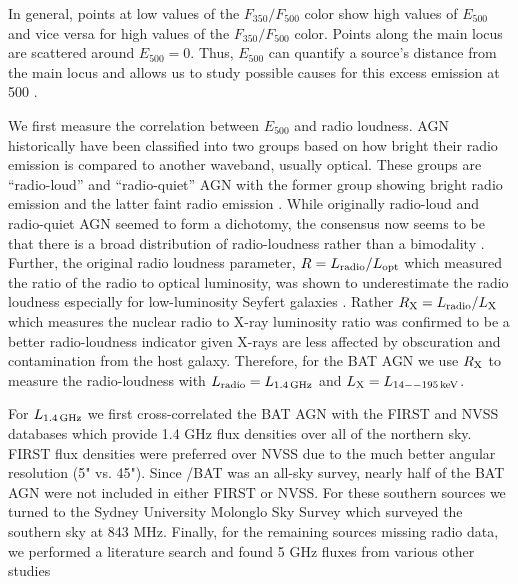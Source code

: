 In general, points at low values of the $F_{350}/F_{500}$ color show high values of $E_{500}$ and vice versa for high values of the $F_{350}/F_{500}$ color. Points along the main locus are scattered around $E_{500} = 0$. Thus, $E_{500}$ can quantify a source's distance from the main locus and allows us to study possible causes for this excess emission at 500 \um.

We first measure the correlation between $E_{500}$ and radio loudness. AGN historically have been classified into two groups based on how bright their radio emission is compared to another waveband, usually optical. These groups are ``radio-loud'' and ``radio-quiet'' AGN with the former group showing bright radio emission and the latter faint radio emission \citep{Kellermann:1989sf,Xu:1999ty}. While originally radio-loud and radio-quiet AGN seemed to form a dichotomy, the consensus now seems to be that there is a broad distribution of radio-loudness rather than a bimodality \citep{Laor:2003yg,White:2000rz,Cirasuolo:2003rm,Cirasuolo:2003zl,Laor:2003yg}. Further, the original radio loudness parameter, $R = L_{\rm radio}/L_{\rm opt}$ which measured the ratio of the radio to optical luminosity, was shown to underestimate the radio loudness especially for low-luminosity Seyfert galaxies \citep{Terashima:2003fv}. Rather $R_{\rm X} = L_{\rm radio}/L_{\rm X}$ which measures the nuclear radio to X-ray luminosity ratio was confirmed to be a better radio-loudness indicator given X-rays are less affected by obscuration and contamination from the host galaxy. Therefore, for the BAT AGN we use $R_{\rm X}$ to measure the radio-loudness with $L_{\rm radio} = L_{\rm 1.4\,GHz}$ and $L_{\rm X} = L_{\rm 14--195\,keV}$. 

For $L_{\rm 1.4\,GHz}$ we first cross-correlated the BAT AGN with the FIRST and NVSS databases which provide 1.4 GHz flux densities over all of the northern sky. FIRST flux densities were preferred over NVSS due to the much better angular resolution (5" vs. 45"). Since \swift/BAT was an all-sky survey, nearly half of the BAT AGN were not included in either FIRST or NVSS. For these southern sources we turned to the Sydney University Molonglo Sky Survey \citep[SUMSS;][]{Bock:1999fp} which surveyed the southern sky at 843 MHz. Finally, for the remaining sources missing radio data, we performed a literature search and found 5 GHz fluxes from various other studies \citep{Becker:1991qd,Griffith:1993qr,Rush:1996db,Ho:2001hl,Shi:2005rc}
  